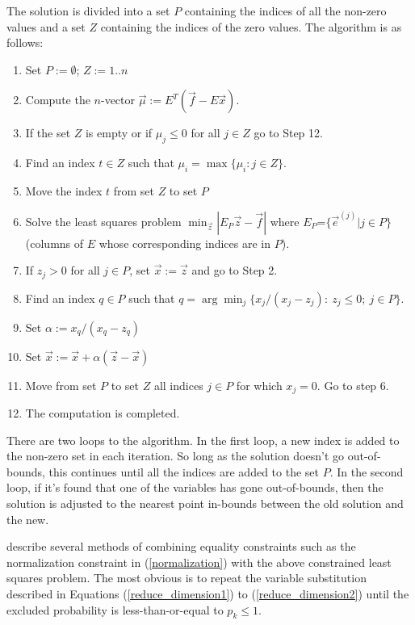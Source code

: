 \documentclass{article}
\begin{document}
The solution is divided into a set $P$ containing the indices of 
all the non-zero values and a set $Z$ containing the indices of the 
zero values.
The algorithm is as follows:
\begin{enumerate}
	\item Set $P := \emptyset$; $Z:=1..n$
	\item Compute the $n$-vector $\vec \mu := E^T(\vec f - E \vec x)$.
	\item If the set $Z$ is empty or if $\mu_j \le 0$ for all $j \in Z$ go to Step 12.
	\item Find an index $t \in Z$ such that $\mu_i = \max \lbrace \mu_i: j \in Z \rbrace$.
	\item Move the index $t$ from set $Z$ to set $P$
	\item Solve the least squares problem $\min_{\vec z} | E_P \vec z - \vec f |$ where $E_P$=$\lbrace \vec e^{(j)} | j \in P \rbrace$ (columns of $E$ whose corresponding indices are in $P$).
	\item If $z_j > 0$ for all $j \in P$, set $\vec x:= \vec z$ and go to Step 2.
	\item Find an index $q \in P$ such that $q = \arg \min_j \lbrace x_j/(x_j - z_j): ~z_j \le 0;~ j \in P \rbrace$.
	\item Set $\alpha := x_q/(x_q - z_q)$
	\item Set $\vec x := \vec x + \alpha(\vec z - \vec x)$
	\item Move from set $P$ to set $Z$ all indices $j \in P$ for which $x_j = 0$. Go to step 6.
	\item The computation is completed.
\end{enumerate}

There are two loops to the algorithm. In the first loop, a new index is added
to the non-zero set in each iteration.
So long as the solution doesn't go out-of-bounds, this continues until all
the indices are added to the set $P$.
In the second loop, if it's found that one of the variables has gone out-of-bounds,
then the solution is adjusted to the nearest point in-bounds between the old solution
and the new.

\citet{Lawson_Hanson1995} describe several methods of combining
equality constraints such as the normalization constraint
in (\ref{normalization}) with the above constrained
least squares problem.
The most obvious is to repeat the variable substitution
described in Equations (\ref{reduce_dimension1}) to (\ref{reduce_dimension2}) until the excluded
probability is less-than-or-equal to $p_k\le 1$.
\end{document}
